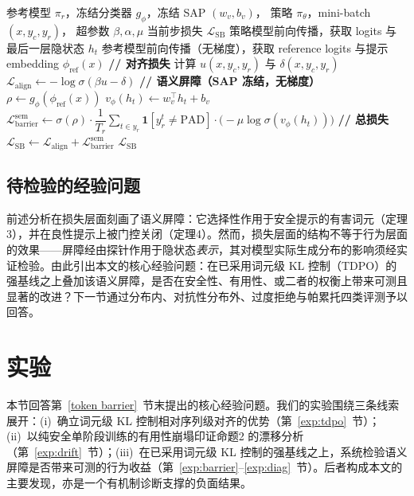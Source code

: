 \documentclass[lettersize,journal]{IEEEtran}
\begin{document}
\begin{algorithm}[h]
\caption{语义屏障单步训练（第二阶段）}
\label{alg:2}
\begin{algorithmic}[1]
\REQUIRE 参考模型 $\pi_r$，冻结分类器 $g_\phi$，冻结 SAP $(w_v,b_v)$，
         策略 $\pi_\theta$，mini-batch $(x,y_c,y_r)$，
         超参数 $\beta,\alpha,\mu$
\ENSURE 当前步损失 $\mathcal{L}_{\text{SB}}$
\STATE 策略模型前向传播，获取 logits 与最后一层隐状态 $h_t$
\STATE 参考模型前向传播（无梯度），获取 reference logits
       与提示 embedding $\phi_{\text{ref}}(x)$
\STATE \textbf{// 对齐损失}
\STATE 计算 $u(x,y_c,y_r)$ 与 $\delta(x,y_c,y_r)$
\STATE $\mathcal{L}_{\text{align}} \leftarrow
       -\log\sigma\!\left(\beta u - \delta\right)$
\STATE \textbf{// 语义屏障（SAP 冻结，无梯度）}
\STATE $\rho \leftarrow g_\phi(\phi_{\text{ref}}(x))$
\STATE $v_\phi(h_t) \leftarrow w_v^\top h_t + b_v$
\STATE $\mathcal{L}^{\text{sem}}_{\text{barrier}} \leftarrow
       \sigma(\rho)\cdot\dfrac{1}{T_r}
       \displaystyle\sum_{t\in y_r}\mathbf{1}[y_r^t\neq\text{PAD}]
       \cdot\bigl(-\mu\log\sigma(v_\phi(h_t))\bigr)$
\STATE \textbf{// 总损失}
\STATE $\mathcal{L}_{\text{SB}} \leftarrow
       \mathcal{L}_{\text{align}} +
       \mathcal{L}^{\text{sem}}_{\text{barrier}}$
\RETURN $\mathcal{L}_{\text{SB}}$
\end{algorithmic}
\end{algorithm}
\subsection{待检验的经验问题}
前述分析在损失层面刻画了语义屏障：它选择性作用于安全提示的有害词元（定理3），并在良性提示上被门控关闭（定理4）。然而，损失层面的结构不等于行为层面的效果——屏障经由探针作用于隐状态\textit{表示}，其对模型实际生成分布的影响须经实证检验。由此引出本文的核心经验问题：在已采用词元级 KL 控制（TDPO）的强基线之上叠加该语义屏障，是否在安全性、有用性、或二者的权衡上带来可测且显著的改进？下一节通过分布内、对抗性分布外、过度拒绝与帕累托四类评测予以回答。

\section{实验}
本节回答第~\ref{token barrier}~节末提出的核心经验问题。我们的实验围绕三条线索展开：(i)~确立词元级 KL 控制相对序列级对齐的优势（第~\ref{exp:tdpo}~节）；(ii)~以纯安全单阶段训练的有用性崩塌印证命题2 的漂移分析（第~\ref{exp:drift}~节）；(iii)~在已采用词元级 KL 控制的强基线之上，系统检验语义屏障是否带来可测的行为收益（第~\ref{exp:barrier}--\ref{exp:diag}~节）。后者构成本文的主要发现，亦是一个有机制诊断支撑的负面结果。
\end{document}
